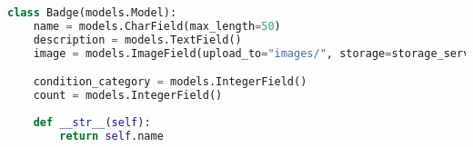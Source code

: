 \begin{lstlisting}[language=Python]
class Badge(models.Model):
    name = models.CharField(max_length=50)
    description = models.TextField()
    image = models.ImageField(upload_to="images/", storage=storage_service)

    condition_category = models.IntegerField()
    count = models.IntegerField()
    
    def __str__(self):
        return self.name

\end{lstlisting}